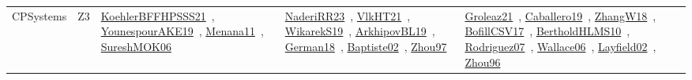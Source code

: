 {\begin{longtable}{lp{3cm}>{\raggedright\arraybackslash}p{6cm}>{\raggedright\arraybackslash}p{6cm}>{\raggedright\arraybackslash}p{8cm}}
CPSystems & Z3 & \href{works/KoehlerBFFHPSSS21.pdf}{KoehlerBFFHPSSS21}~\cite{KoehlerBFFHPSSS21}, \href{works/YounespourAKE19.pdf}{YounespourAKE19}~\cite{YounespourAKE19}, \href{works/Menana11.pdf}{Menana11}~\cite{Menana11}, \href{works/SureshMOK06.pdf}{SureshMOK06}~\cite{SureshMOK06} & \href{works/NaderiRR23.pdf}{NaderiRR23}~\cite{NaderiRR23}, \href{works/VlkHT21.pdf}{VlkHT21}~\cite{VlkHT21}, \href{works/WikarekS19.pdf}{WikarekS19}~\cite{WikarekS19}, \href{works/ArkhipovBL19.pdf}{ArkhipovBL19}~\cite{ArkhipovBL19}, \href{works/German18.pdf}{German18}~\cite{German18}, \href{works/Baptiste02.pdf}{Baptiste02}~\cite{Baptiste02}, \href{works/Zhou97.pdf}{Zhou97}~\cite{Zhou97} & \href{works/Groleaz21.pdf}{Groleaz21}~\cite{Groleaz21}, \href{works/Caballero19.pdf}{Caballero19}~\cite{Caballero19}, \href{works/ZhangW18.pdf}{ZhangW18}~\cite{ZhangW18}, \href{works/BofillCSV17.pdf}{BofillCSV17}~\cite{BofillCSV17}, \href{works/BertholdHLMS10.pdf}{BertholdHLMS10}~\cite{BertholdHLMS10}, \href{works/Rodriguez07.pdf}{Rodriguez07}~\cite{Rodriguez07}, \href{works/Wallace06.pdf}{Wallace06}~\cite{Wallace06}, \href{works/Layfield02.pdf}{Layfield02}~\cite{Layfield02}, \href{works/Zhou96.pdf}{Zhou96}~\cite{Zhou96}\\
\end{longtable}
}

